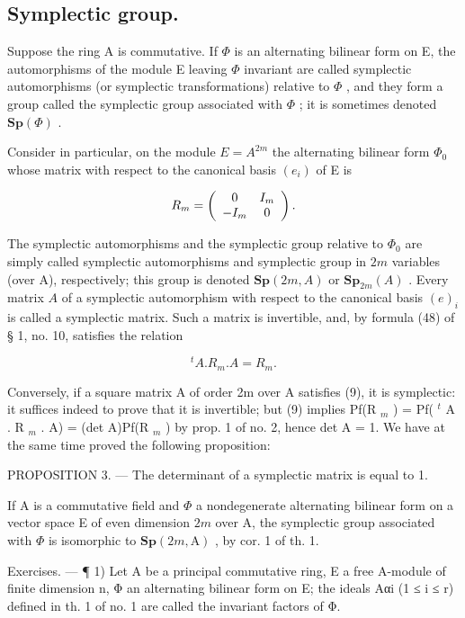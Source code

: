 \subsection{Symplectic group.}

Suppose the ring A is commutative. If \(\Phi\) is an alternating bilinear form on E, the automorphisms of the module E leaving \(\Phi\) invariant are called symplectic automorphisms (or symplectic transformations) relative to \(\Phi\) , and they form a group called the symplectic group associated with \(\Phi\) ; it is sometimes denoted \(\mathbf{Sp}(\Phi)\) .

Consider in particular, on the module \(E = A^{2m}\) the alternating bilinear form \(\Phi_{0}\) whose matrix with respect to the canonical basis \((e_{i})\) of E is

\[
R _ {m} = \left( \begin{array}{c c} 0 & I _ {m} \\ - I _ {m} & 0 \end{array} \right).
\]

The symplectic automorphisms and the symplectic group relative to \(\Phi_{0}\) are simply called symplectic automorphisms and symplectic group in \(2m\) variables (over A), respectively; this group is denoted \(\mathbf{Sp}(2m, A)\) or \(\mathbf{Sp}_{2m}(A)\) . Every matrix \(A\) of a symplectic automorphism with respect to the canonical basis \((e)_i\) is called a symplectic matrix. Such a matrix is invertible, and, by formula (48) of § 1, no. 10, satisfies the relation

\[
{ } ^ { t } A . R _ { m } . A = R _ { m } .\tag{9}
\]

Conversely, if a square matrix A of order 2m over A satisfies (9), it is symplectic: it suffices indeed to prove that it is invertible; but (9) implies Pf(R \(_{m}\) ) = Pf( \(^{t}\) A . R \(_{m}\) . A) = (det A)Pf(R \(_{m}\) ) by prop. 1 of no. 2, hence det A = 1. We have at the same time proved the following proposition:

PROPOSITION 3. --- The determinant of a symplectic matrix is equal to 1.

If A is a commutative field and \(\Phi\) a nondegenerate alternating bilinear form on a vector space E of even dimension \(2m\) over A, the symplectic group associated with \(\Phi\) is isomorphic to \(\mathbf{Sp}(2m, \mathrm{A})\) , by cor. 1 of th. 1.

Exercises. --- ¶ 1) Let A be a principal commutative ring, E a free A-module of finite dimension n, Φ an alternating bilinear form on E; the ideals Aαi (1 ≤ i ≤ r) defined in th. 1 of no. 1 are called the invariant factors of Φ.


